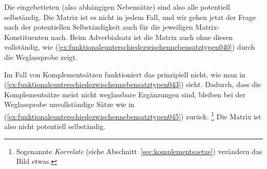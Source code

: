 \begin{exe}
  \ex\label{ex:funktionaleunterschiedezwischennebensatztypen037}
  \begin{xlist}
  \end{xlist}
\end{exe}

Die eingebetteten (also abhängigen Nebensätze) sind also alle potentiell selbständig.
Die Matrix ist es nicht in jedem Fall, und wir gehen jetzt der Frage nach der potentiellen Selbständigkeit auch für die jeweiligen Matrix-Konstituenten nach.
Beim Adverbialsatz ist die Matrix auch ohne diesen vollständig, wie (\ref{ex:funktionaleunterschiedezwischennebensatztypen040}) durch die Weglassprobe zeigt.

\begin{exe}
  \ex\label{ex:funktionaleunterschiedezwischennebensatztypen040}
    \begin{xlist}
    \end{xlist}
\end{exe}

Im Fall von Komplementsätzen funktioniert das prinzipiell nicht, wie man in (\ref{ex:funktionaleunterschiedezwischennebensatztypen043}) sieht.
Dadurch, dass die Komplementsätze meist nicht weglassbare Ergänzungen sind, bleiben bei der Weglassprobe unvollständige Sätze wie in (\ref{ex:funktionaleunterschiedezwischennebensatztypen045}) zurück.%
\footnote{Sogenannte \textit{Korrelate} (siehe Abschnitt~\ref{sec:komplementsaetze}) verändern das Bild etwas.}
Die Matrix ist also nicht potentiell selbständig.
    
\begin{exe}
    \ex\label{ex:funktionaleunterschiedezwischennebensatztypen043}
    \begin{xlist}
    \end{xlist}
\end{exe}

